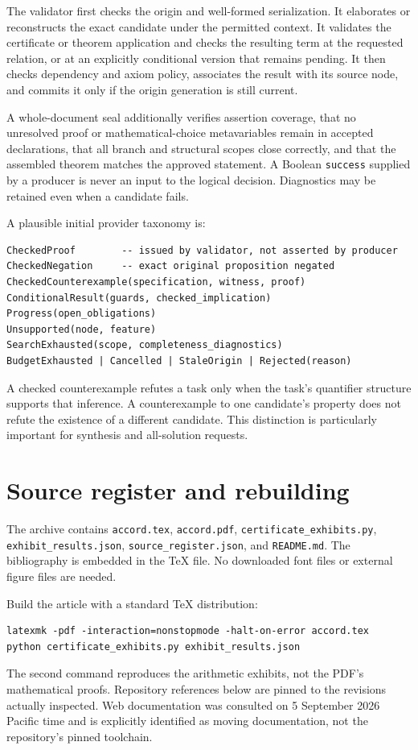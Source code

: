 \documentclass[11pt,letterpaper]{article}
\newcommand{\code}[1]{\nolinkurl{#1}}
\theoremstyle{definition}
\begin{document}
The validator first checks the origin and well-formed serialization. It elaborates
or reconstructs the exact candidate under the permitted context. It validates the
certificate or theorem application and checks the resulting term at the requested
relation, or at an explicitly conditional version that remains pending. It then
checks dependency and axiom policy, associates the result with its source node,
and commits it only if the origin generation is still current.

A whole-document seal additionally verifies assertion coverage, that no unresolved
proof or mathematical-choice metavariables remain in accepted declarations, that
all branch and structural scopes close correctly, and that the assembled theorem
matches the approved statement. A Boolean \code{success} supplied by a producer is
never an input to the logical decision. Diagnostics may be retained even when a
candidate fails.

A plausible initial provider taxonomy is:
\begin{lstlisting}
CheckedProof        -- issued by validator, not asserted by producer
CheckedNegation     -- exact original proposition negated
CheckedCounterexample(specification, witness, proof)
ConditionalResult(guards, checked_implication)
Progress(open_obligations)
Unsupported(node, feature)
SearchExhausted(scope, completeness_diagnostics)
BudgetExhausted | Cancelled | StaleOrigin | Rejected(reason)
\end{lstlisting}
A checked counterexample refutes a task only when the task's quantifier structure
supports that inference. A counterexample to one candidate's property does not
refute the existence of a different candidate. This distinction is particularly
important for synthesis and all-solution requests.

\section{Source register and rebuilding}\label{app:sources}
The archive contains \code{accord.tex}, \code{accord.pdf},
\code{certificate_exhibits.py}, \code{exhibit_results.json},
\code{source_register.json}, and \code{README.md}. The bibliography is embedded in
the TeX file. No downloaded font files or external figure files are needed.

Build the article with a standard TeX distribution:
\begin{lstlisting}
latexmk -pdf -interaction=nonstopmode -halt-on-error accord.tex
python certificate_exhibits.py exhibit_results.json
\end{lstlisting}
The second command reproduces the arithmetic exhibits, not the PDF's mathematical
proofs. Repository references below are pinned to the revisions actually inspected.
Web documentation was consulted on 5 September 2026 Pacific time and is explicitly
identified as moving documentation, not the repository's pinned toolchain.
\end{document}
